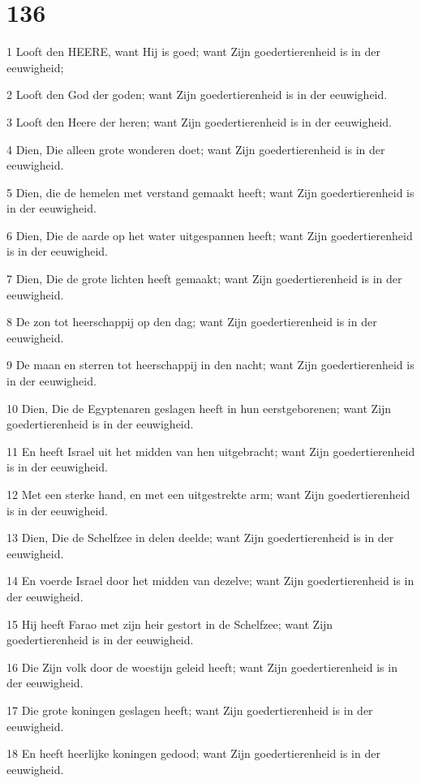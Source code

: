 \chapter{136}

\par 1 Looft den HEERE, want Hij is goed; want Zijn goedertierenheid is in der eeuwigheid;
\par 2 Looft den God der goden; want Zijn goedertierenheid is in der eeuwigheid.
\par 3 Looft den Heere der heren; want Zijn goedertierenheid is in der eeuwigheid.
\par 4 Dien, Die alleen grote wonderen doet; want Zijn goedertierenheid is in der eeuwigheid.
\par 5 Dien, die de hemelen met verstand gemaakt heeft; want Zijn goedertierenheid is in der eeuwigheid.
\par 6 Dien, Die de aarde op het water uitgespannen heeft; want Zijn goedertierenheid is in der eeuwigheid.
\par 7 Dien, Die de grote lichten heeft gemaakt; want Zijn goedertierenheid is in der eeuwigheid.
\par 8 De zon tot heerschappij op den dag; want Zijn goedertierenheid is in der eeuwigheid.
\par 9 De maan en sterren tot heerschappij in den nacht; want Zijn goedertierenheid is in der eeuwigheid.
\par 10 Dien, Die de Egyptenaren geslagen heeft in hun eerstgeborenen; want Zijn goedertierenheid is in der eeuwigheid.
\par 11 En heeft Israel uit het midden van hen uitgebracht; want Zijn goedertierenheid is in der eeuwigheid.
\par 12 Met een sterke hand, en met een uitgestrekte arm; want Zijn goedertierenheid is in der eeuwigheid.
\par 13 Dien, Die de Schelfzee in delen deelde; want Zijn goedertierenheid is in der eeuwigheid.
\par 14 En voerde Israel door het midden van dezelve; want Zijn goedertierenheid is in der eeuwigheid.
\par 15 Hij heeft Farao met zijn heir gestort in de Schelfzee; want Zijn goedertierenheid is in der eeuwigheid.
\par 16 Die Zijn volk door de woestijn geleid heeft; want Zijn goedertierenheid is in der eeuwigheid.
\par 17 Die grote koningen geslagen heeft; want Zijn goedertierenheid is in der eeuwigheid.
\par 18 En heeft heerlijke koningen gedood; want Zijn goedertierenheid is in der eeuwigheid.
